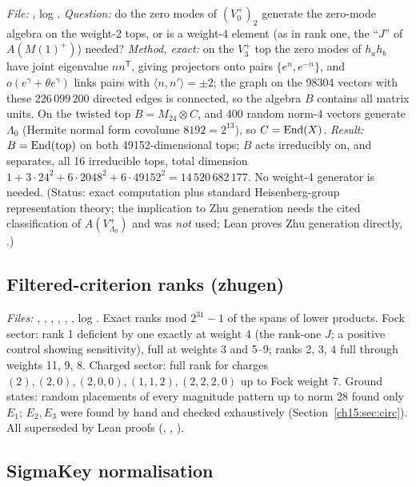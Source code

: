 \emph{File:} , log . \emph{Question:} do the zero modes of
$(V_0^+)_2$ generate the zero-mode algebra on the weight-2 tops, or is a weight-4 element (as in
rank one, the ``$J$'' of $A(M(1)^+)$) needed? \emph{Method, exact:} on the $V_3^+$ top the zero
modes of $h_ah_b$ have joint eigenvalue $nn^{\mathsf T}$, giving projectors onto pairs
$\{e^n,e^{-n}\}$, and $o(e^\gamma+\theta e^\gamma)$ links pairs with $\langle n,n'\rangle=\pm2$; the graph on the
98304 vectors with these $226\,099\,200$ directed edges is connected, so the algebra $B$ contains
all matrix units. On the twisted top $B=M_{24}\otimes C$, and 400 random norm-4 vectors generate
$\Lambda_0$ (Hermite normal form covolume $8192=2^{13}$), so $C=\operatorname{End}(X)$. \emph{Result:} $B=\operatorname{End}(\mathrm{top})$
on both 49152-dimensional tops; $B$ acts irreducibly on, and separates, all 16 irreducible tops, total
dimension $1+3\cdot24^2+6\cdot2048^2+6\cdot49152^2=14\,520\,682\,177$. No weight-4 generator is
needed. (Status: exact computation plus standard Heisenberg-group representation theory; the
implication to Zhu generation needs the cited classification of $A(V_{\Lambda_0}^+)$ and was
\emph{not} used; Lean proves Zhu generation directly, .)

\subsection{Filtered-criterion ranks (zhugen)}

\emph{Files:} , , ,
, , , log . Exact ranks
mod $2^{31}-1$ of the spans of lower products. Fock sector: rank 1 deficient by one exactly at
weight 4 (the rank-one $J$; a positive control showing sensitivity), full at weights 3 and 5--9;
ranks 2, 3, 4 full through weights 11, 9, 8. Charged sector: full rank for charges
$(2),(2,0),(2,0,0),(1,1,2),(2,2,2,0)$ up to Fock weight 7. Ground states: random placements of every
magnitude pattern up to norm 28 found only $E_1$; $E_2,E_3$ were found by hand and checked
exhaustively (Section~\ref{ch15:sec:circ}). All superseded by Lean proofs (,
, ).

\subsection{SigmaKey normalisation}\label{ch15:sec:num-sigmakey}


